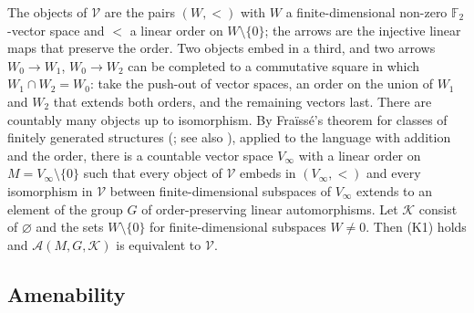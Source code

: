 \documentclass[11pt,a4paper]{article}
\theoremstyle{definition}
\newcommand{\A}{\mathcal{A}}
\newcommand{\K}{\mathcal{K}}
\newcommand{\V}{\mathcal{V}}
\newcommand{\F}{\mathbb{F}}
\begin{document}
The objects of $\V$ are the pairs $(W,<)$ with $W$ a finite-dimensional
non-zero $\F_2$-vector space and $<$ a linear order on $W\setminus\{0\}$; the
arrows are the injective linear maps that preserve the order. Two objects
embed in a third, and two arrows $W_0\to W_1$, $W_0\to W_2$ can be completed
to a commutative square in which $W_1\cap W_2=W_0$: take the push-out of
vector spaces, an order on the union of $W_1$ and $W_2$ that extends both
orders, and the remaining vectors last. There are countably many objects up
to isomorphism. By Fra\"iss\'e's theorem for classes of finitely generated
structures (\cite[\S7.1]{Ho}; see also \cite[Theorem~2.2]{KPT}), applied to the language with addition and the
order, there is a countable vector space $V_\infty$ with a linear order on
$M=V_\infty\setminus\{0\}$ such that every object of $\V$ embeds in
$(V_\infty,<)$ and every isomorphism in $\V$ between finite-dimensional
subspaces of $V_\infty$ extends to an element of the group $G$ of
order-preserving linear automorphisms. Let $\K$ consist of $\varnothing$
and the sets $W\setminus\{0\}$ for finite-dimensional subspaces $W\ne0$.
Then \textup{(K1)} holds and $\A(M,G,\K)$ is equivalent to $\V$.

\subsection{Amenability}
\end{document}
